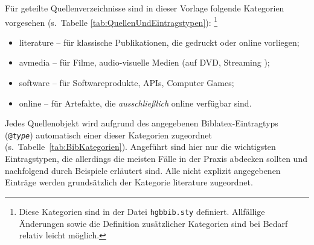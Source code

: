 Für geteilte Quellenverzeichnisse sind in dieser Vorlage folgende Kategorien
vorgesehen (s.\ Tabelle \ref{tab:QuellenUndEintragstypen}):%
\footnote{Diese Kategorien sind in der Datei \nolinkurl{hgbbib.sty} definiert.
Allfällige Änderungen sowie die Definition zusätzlicher Kategorien sind bei
Bedarf relativ leicht möglich.}
%
\begin{itemize}
    \item[] \textsf{literature} -- für klassische Publikationen, die gedruckt
    oder online vorliegen;
    \item[] \textsf{avmedia} -- für Filme, audio-visuelle Medien (auf DVD,
    Streaming \usw);
    \item[] \textsf{software} -- für Softwareprodukte, APIs, Computer Games;
    \item[] \textsf{online} -- für Artefakte, die \emph{ausschließlich}
    online verfügbar sind.
\end{itemize}
%
Jedes Quellenobjekt wird aufgrund des angegebenen Biblatex-Eintragtyps
(\texttt{@\emph{type}}) automatisch einer dieser Kategorien zugeordnet (s.\
Tabelle~\ref{tab:BibKategorien}). Angeführt sind hier nur die wichtigsten
Eintragstypen, die allerdings die meisten Fälle in der Praxis abdecken
sollten und nachfolgend durch Beispiele erläutert sind. Alle nicht explizit
angegebenen Einträge werden grundsätzlich der Kategorie \textsf{literature}
zugeordnet.

